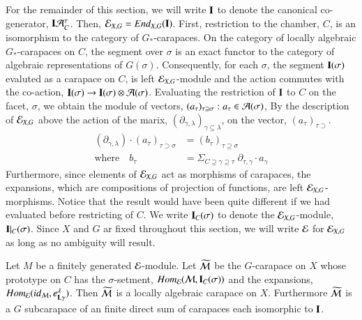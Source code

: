 For the remainder of this section, we will write $\mathbf{I}$ to denote the canonical co-generator, $\mathbf{I}\mathcal{A}_{C}^{\tau}$. Then, $\mathcal{E}_{X, G} = End_{X, G}(\mathbf{I})$. First, restriction to the chamber, $C$, is an isomorphism to the category of $G_{*}$-carapaces. On the category of locally algebraic $G_{*}$-carapaces on $C$, the segment over $\sigma$ is an exact functor to the category of algebraic representations of $G(\sigma)$. Consequently, for each $\sigma$, the segment $\mathbf{I}(\sigma)$ evaluted as a carapace on $C$, is left $\mathcal{E}_{X, G}$-module and the action commutes with the co-action, $\mathbf{I}(\sigma) \rightarrow \mathbf{I}(\sigma) \otimes \mathcal{A}(\sigma)$. Evaluating the restriction of $\mathbf{I}$ to $C$ on the facet, $\sigma$, we obtain the module of vectors, $(a_{\tau})_{\tau \supseteq \sigma} : a_{\tau} \in \mathcal{A}(\sigma)$, By the description of $\mathcal{E}_{X,G}$ above the action of the marix, $(\partial_{\gamma, \lambda})_{\gamma \subseteq \lambda}$, on the vector, $(a_{\tau})_{\tau \supset}$.
\begin{equation}
\begin{aligned}\label{art6-eq-15.3}
(\partial_{\gamma,\lambda}) \cdot (a_{\tau})_{\tau \supset \sigma} &= (b_{\tau})_{\tau \supseteq \sigma}\\
\text{where} \quad b_{\tau} &= \Sigma_{C \supseteq \gamma \supseteq \tau}\; \partial_{\tau, \gamma} \cdot a_{\gamma}
\end{aligned}
\end{equation}
Furthermore, since elements of $\mathcal{E}_{X, G}$ act as morphisms of carapaces, the expansions, which are compositions of projection of functions, are left $\mathcal{E}_{X,G}$-morphisms. Notice that the result would have been quite different if we had evaluated before restricting of $C$. We write $\mathbf{I}_{C}(\sigma)$ to denote the $\mathcal{E}_{X, G}$-module, $\mathbf{I}|_{C}(\sigma)$. Since $X$ and $G$ ar fixed throughout this section, we will write $\mathcal{E}$ for $\mathcal{E}_{X, G}$ as long as no ambiguity will result.

\begin{lem}\label{art6-lemma-15.4}
Let $M$ be a finitely generated $\mathcal{E}$-module. Let $\widetilde{\mathcal{M}}$ be the $G$-carapace on $X$ whose prototype on $C$ has the $\sigma$-setment, $Hom_{\mathcal{E}}(\mathcal{M}, \mathbf{I}_{C}(\sigma))$ and the expansions, $Hom_{\mathcal{E}}(id_{\mathcal{M}}, e_{\mathbf{I}, \gamma}^{\lambda})$. Then $\widetilde{\mathcal{M}}$ is a locally algebraic carapace on $X$. Furthermore $\widetilde{\mathcal{M}}$ is a $G$ subcarapace of an finite direct sum of carapaces each isomorphic to $\mathbf{I}$.
\end{lem}

